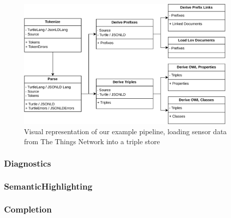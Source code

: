 \begin{figure}[!ht]
    \centering
    \includegraphics[width=0.95\textwidth]{./images/ParseSchedule.pdf}
    \caption{Visual representation of our example pipeline, 
        loading sensor data from The Things Network into a triple store}\label{fig:Pipeline}
\end{figure}


\subsubsection*{Diagnostics}




\subsubsection*{SemanticHighlighting}

\subsubsection*{Completion}



